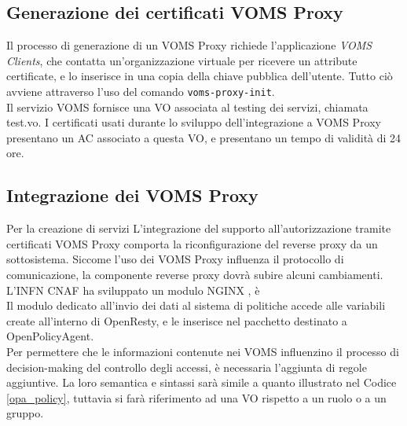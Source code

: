 \subsection{Generazione dei certificati VOMS Proxy}
Il processo di generazione di un VOMS Proxy richiede l'applicazione \textit{VOMS Clients}, che contatta un'organizzazione virtuale per ricevere un attribute 
certificate, e lo inserisce in una copia della chiave pubblica dell'utente. Tutto ciò avviene attraverso l'uso del comando \texttt{voms-proxy-init}. 
\\Il servizio VOMS fornisce una VO associata al testing dei servizi, chiamata test.vo. I certificati usati durante lo sviluppo 
dell'integrazione a VOMS Proxy presentano un AC associato a questa VO, e presentano un tempo di validità di 24 ore.   

\subsection{Integrazione dei VOMS Proxy}
Per la creazione di servizi 
L'integrazione del supporto all'autorizzazione tramite certificati VOMS Proxy comporta la riconfigurazione del reverse proxy da un sottosistema.   
Siccome l'uso dei VOMS Proxy influenza il protocollo di comunicazione, la componente reverse proxy dovrà subire alcuni cambiamenti. 
\\ L'INFN CNAF ha sviluppato un modulo NGINX , è
\\Il modulo dedicato all'invio dei dati al sistema di politiche accede alle variabili create all'interno di OpenResty, 
e le inserisce nel pacchetto destinato a OpenPolicyAgent. 
\\ Per permettere che le informazioni contenute nei VOMS influenzino il processo di decision-making del controllo degli accessi,
 è necessaria l'aggiunta di regole aggiuntive. La loro semantica e sintassi sarà simile a quanto illustrato nel Codice \ref*{opa_policy},
tuttavia si farà riferimento ad una VO rispetto a un ruolo o a un gruppo.

